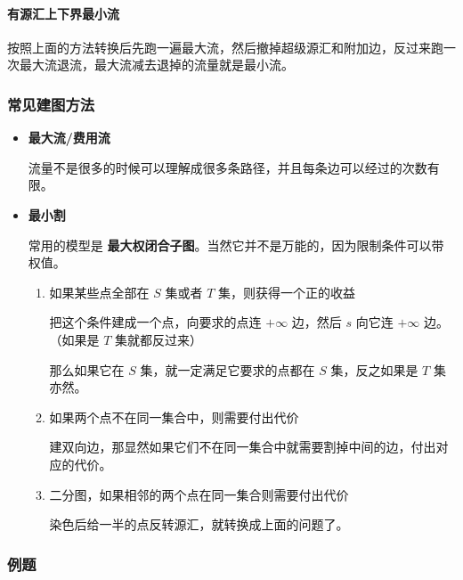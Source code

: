 \inputminted{cpp}{../src/graph/有源汇上下界最大流.cpp}

\paragraph{有源汇上下界最小流}
按照上面的方法转换后先跑一遍最大流，然后撤掉超级源汇和附加边，反过来跑一次最大流退流，最大流减去退掉的流量就是最小流。

\subsubsection{常见建图方法}

\begin{itemize}

\item \textbf{最大流/费用流}

流量不是很多的时候可以理解成很多条路径，并且每条边可以经过的次数有限。

\item \textbf{最小割}

常用的模型是 \textbf{最大权闭合子图}。当然它并不是万能的，因为限制条件可以带权值。

\begin{enumerate}

\item 如果某些点全部在 $S$ 集或者 $T$ 集，则获得一个正的收益

把这个条件建成一个点，向要求的点连 $+\infty$ 边，然后 $s$ 向它连 $+\infty$ 边。（如果是 $T$ 集就都反过来）

那么如果它在 $S$ 集，就一定满足它要求的点都在 $S$ 集，反之如果是 $T$ 集亦然。

\item 如果两个点不在同一集合中，则需要付出代价

建双向边，那显然如果它们不在同一集合中就需要割掉中间的边，付出对应的代价。

\item 二分图，如果相邻的两个点在同一集合则需要付出代价

染色后给一半的点反转源汇，就转换成上面的问题了。

\end{enumerate}

\end{itemize}

\subsubsection{例题}

